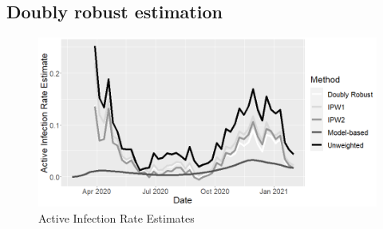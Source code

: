 \documentclass[11pt]{amsart}
\numberwithin{equation}{section}
\theoremstyle{plain}
\begin{document}
\subsection{Doubly robust estimation}
%
%


\begin{figure}[!th]
\centering
\includegraphics[width=.6\linewidth]{../figs/tv_air.png}
\caption{Active Infection Rate Estimates}
\label{fig:testinglik_mainpaper}
\end{figure}
\end{document}
